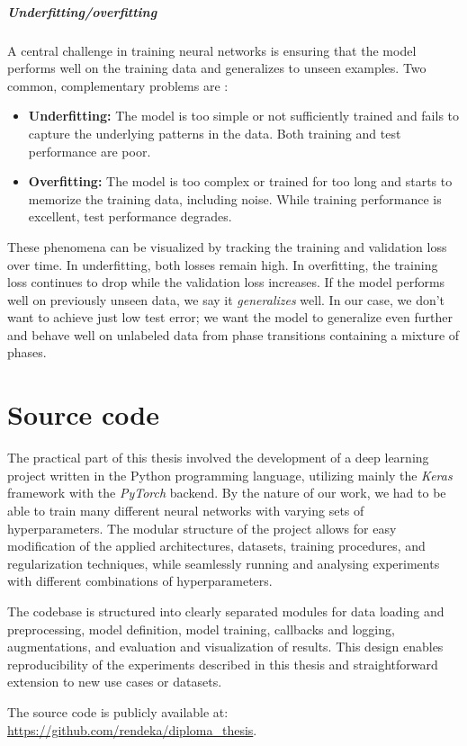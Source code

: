 \paragraph{Underfitting/overfitting}
\label{sec:uofitting}
A central challenge in training neural networks is ensuring that the model performs well on the training data and generalizes to unseen examples. Two common, complementary problems are \cite{bengio2017deep}:
\begin{itemize}
    \item \textbf{Underfitting:} The model is too simple or not sufficiently trained and fails to capture the underlying patterns in the data. Both training and test performance are poor.
    \item \textbf{Overfitting:} The model is too complex or trained for too long and starts to memorize the training data, including noise. While training performance is excellent, test performance degrades.
\end{itemize}
These phenomena can be visualized by tracking the training and validation loss over time. In underfitting, both losses remain high. In overfitting, the training loss continues to drop while the validation loss increases. If the model performs well on previously unseen data, we say it \emph{generalizes} well. In our case, we don't want to achieve just low test error; we want the model to generalize even further and behave well on unlabeled data from phase transitions containing a mixture of phases.

\chapter{Source code}

The practical part of this thesis involved the development of a deep learning project written in the Python programming language, utilizing mainly the \emph{Keras} framework \cite{chollet2015keras} with the \emph{PyTorch} \cite{paszke2019pytorch} backend. By the nature of our work, we had to be able to train many different neural networks with varying sets of hyperparameters. The modular structure of the project allows for easy modification of the applied architectures, datasets, training procedures, and regularization techniques, while seamlessly running and analysing experiments with different combinations of hyperparameters.

The codebase is structured into clearly separated modules for data loading and preprocessing, model definition, model training, callbacks and logging, augmentations, and evaluation and visualization of results. This design enables reproducibility of the experiments described in this thesis and straightforward extension to new use cases or datasets.

The source code is publicly available at: \url{https://github.com/rendeka/diploma_thesis}.